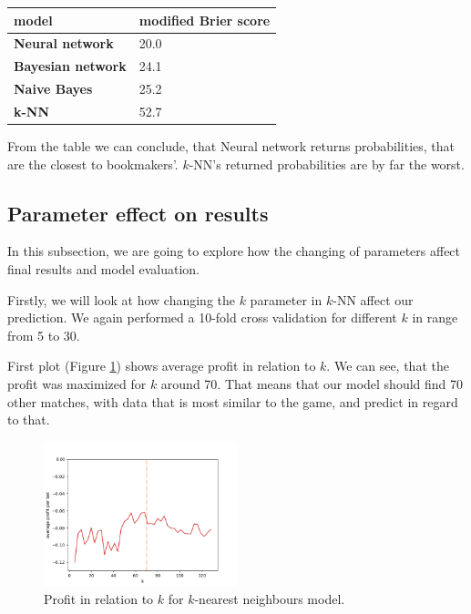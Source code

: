 \documentclass[conference]{IEEEtran}
\begin{document}
\begin{table}[!ht]
    \centering
    \begin{tabular}{|l|l|}
    \hline
        \textbf{model} & modified Brier score \\ \hline
        \textbf{Neural network} & 20.0 \\ \hline
        \textbf{Bayesian network} & 24.1 \\ \hline
        \textbf{Naive Bayes} & 25.2 \\ \hline
        \textbf{k-NN} & 52.7 \\ \hline
    \end{tabular}
\end{table}

From the table we can conclude, that Neural network returns probabilities, that are the 
closest to bookmakers'. $k$-NN's returned probabilities are by far the worst.

\subsection{Parameter effect on results}

In this subsection, we are going to explore how the changing of parameters affect final 
results and model evaluation. 

Firstly, we will look at how changing the $k$ parameter in $k$-NN affect our prediction.
We again performed a 10-fold cross validation for different $k$ in range from 5 to 30.

First plot (Figure \ref{profit-knn}) shows average profit in relation to $k$. We can see, 
that the profit was maximized for $k$ around 70. That means that our model should find 70 
other matches, with data that is most similar to the game, and predict in regard to that.

\begin{figure}[!ht]
\includegraphics[width=0.5\textwidth]{profit_k_knn.png}
\caption{Profit in relation to $k$ for $k$-nearest neighbours model.}
\label{profit-knn}
\end{figure}
\end{document}
